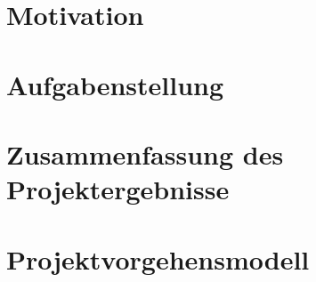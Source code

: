 
\section{Motivation}
\section{Aufgabenstellung}
\section{Zusammenfassung des Projektergebnisse}
\section{Projektvorgehensmodell}